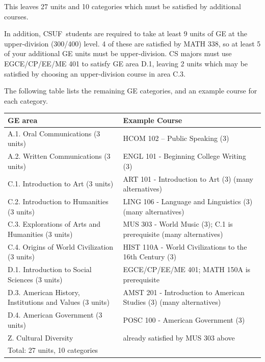 \documentclass{book}
\newcommand{\campusname}{CSUF}
\begin{document}
This leaves 27 units and 10 categories which must be satisfied by additional courses.

In addition, \campusname~students are required to take at least 9 units of GE at the upper-division (300/400) level. 4 of these are satisfied by MATH 338, so at least 5 of your additional GE units must be upper-division. CS majors must use EGCE/CP/EE/ME 401 to satisfy GE area D.1, leaving 2 units which may be satisfied by choosing an upper-division course in area C.3.

The following table lists the remaining GE categories, and an example course for each category.

\begin{center}
\begin{tabular}{| p{3in} | p{3in} |} \hline
  \textbf{GE area} & \textbf{Example Course} \\ \hline
  A.1. Oral Communications (3 units) & HCOM 102 – Public Speaking (3) \\ \hline
  A.2. Written Communications (3 units) & ENGL 101 - Beginning College Writing (3) \\ \hline
  C.1. Introduction to Art (3 units) & ART 101 - Introduction to Art (3) (many alternatives) \\ \hline
  C.2. Introduction to Humanities (3 units) & LING 106 - Language and Linguistics (3) (many alternatives) \\ \hline
  C.3. Explorations of Arts and Humanities (3 units) & MUS 303 - World Music (3); C.1 is prerequisite (many alternatives) \\ \hline
  C.4. Origins of World Civilization (3 units) & HIST 110A - World Civilizations to the 16th Century (3) \\ \hline
  D.1. Introduction to Social Sciences (3 units) & EGCE/CP/EE/ME 401; MATH 150A is prerequisite \\ \hline
  D.3. American History, Institutions and Values (3 units) & AMST 201 - Introduction to American Studies (3) (many alternatives) \\ \hline
  D.4. American Government (3 units) & POSC 100 - American Government (3) \\ \hline
  Z. Cultural Diversity & already satisfied by MUS 303 above \\ \hline
  \multicolumn{2}{|l|}{Total: 27 units, 10 categories} \\ \hline
\end{tabular}
\end{center}
\end{document}

